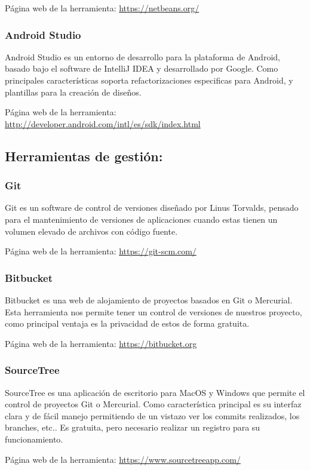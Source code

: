Página web de la herramienta: \url{https://netbeans.org/}

\subsubsection{Android Studio}
Android Studio es un entorno de desarrollo para la plataforma de Android, basado bajo el software de IntelliJ IDEA y desarrollado por Google. Como principales características soporta refactorizaciones especificas para Android, y plantillas para la creación de diseños.

Página web de la herramienta: \url{http://developer.android.com/intl/es/sdk/index.html}
\subsection{Herramientas de gestión:}

\subsubsection{Git}
Git es un software de control de versiones diseñado por Linus Torvalds, pensado para el mantenimiento de versiones de aplicaciones cuando estas tienen un volumen elevado de archivos con código fuente.

Página web de la herramienta: \url{https://git-scm.com/}

\subsubsection{Bitbucket} 
Bitbucket es una web de alojamiento de proyectos basados en Git o Mercurial. Esta herramienta nos permite tener un control de versiones de nuestros proyecto, como principal ventaja es la privacidad de estos de forma gratuita.

Página web de la herramienta: \url{https://bitbucket.org}

\subsubsection{SourceTree}
SourceTree es una aplicación de escritorio para MacOS y Windows que permite el control de proyectos Git o Mercurial.
Como característica principal es su interfaz clara y de fácil manejo permitiendo de un vistazo ver los commits realizados, los branches, etc..
Es gratuita, pero necesario realizar un registro para su funcionamiento.

Página web de la herramienta: \url{https://www.sourcetreeapp.com/}

